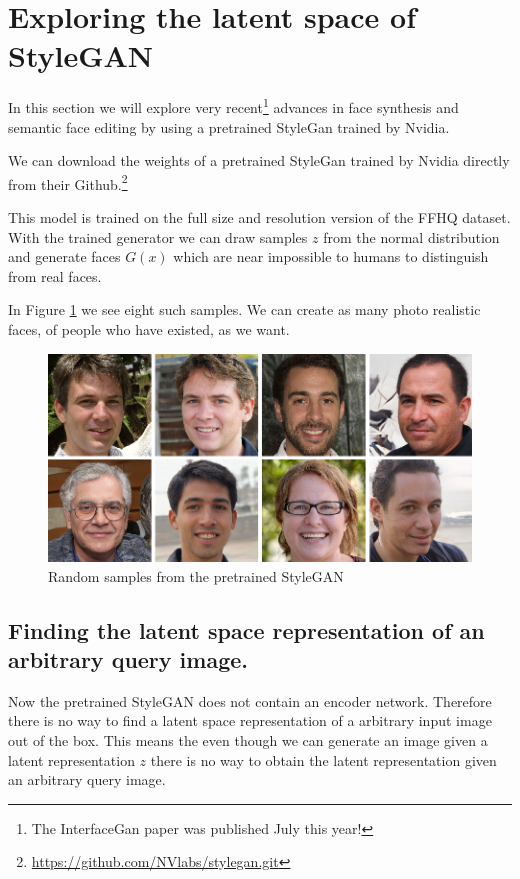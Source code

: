 
\section{Exploring the latent space of StyleGAN}
\label{stylegan}

In this section we will explore very recent\footnote{The InterfaceGan paper was published July this year!} advances in face synthesis and semantic face editing by using a pretrained StyleGan trained by Nvidia.

We can download the weights of a pretrained StyleGan trained by Nvidia directly from their Github.\footnote{\url{https://github.com/NVlabs/stylegan.git}}\cite{stylegan}

This model is trained on the full size and resolution version of the FFHQ dataset.
With the trained generator we can draw samples $z$ from the normal distribution and generate faces $G(x)$ which are near impossible to humans to distinguish from real faces.

In Figure \ref{StyleGAN-examples} we see eight such samples. We can create as many photo realistic faces, of people who have existed, as we want.
\begin{figure}[h!]
  \includegraphics[width=\textwidth]{fig/stylegan/randomsamples}
  \caption{Random samples from the pretrained StyleGAN}
  \label{StyleGAN-examples}
\end{figure}



\subsection{Finding the latent space representation of an arbitrary query image.}

Now the pretrained StyleGAN does not contain an encoder network. Therefore there is no way to find a latent space representation of a arbitrary input image out of the box. This means the even though we can generate an image given a latent representation $z$ there is no way to obtain the latent representation given an arbitrary query image.

